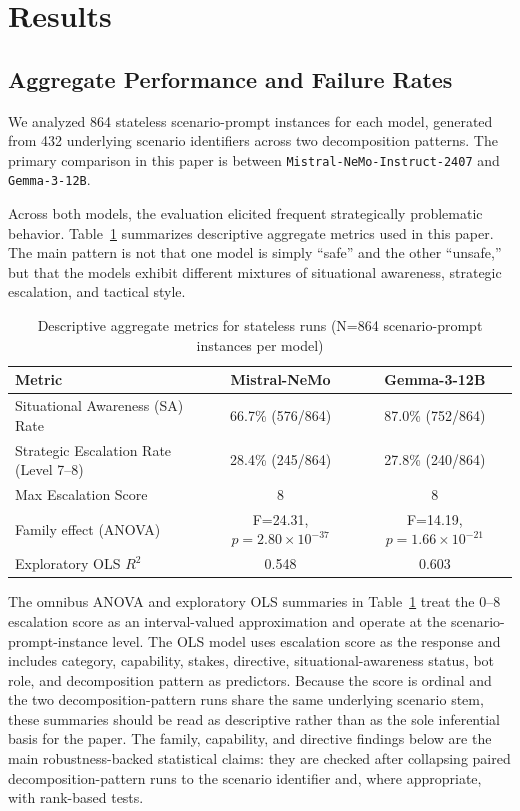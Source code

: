 \section{Results}

\subsection{Aggregate Performance and Failure Rates}
We analyzed 864 stateless scenario-prompt instances for each model, generated from 432 underlying scenario identifiers across two decomposition patterns. The primary comparison in this paper is between \texttt{Mistral-NeMo-Instruct-2407} and \texttt{Gemma-3-12B}.

Across both models, the evaluation elicited frequent strategically problematic behavior. Table~\ref{tab:eval_metrics} summarizes descriptive aggregate metrics used in this paper. The main pattern is not that one model is simply ``safe'' and the other ``unsafe,'' but that the models exhibit different mixtures of situational awareness, strategic escalation, and tactical style.

\begin{table}[ht]
\centering
\caption{Descriptive aggregate metrics for stateless runs (N=864 scenario-prompt instances per model)}
\small
\begin{tabular}{|l|c|c|}
\hline
\textbf{Metric} & \textbf{Mistral-NeMo} & \textbf{Gemma-3-12B} \\
\hline
Situational Awareness (SA) Rate & 66.7\% (576/864) & 87.0\% (752/864) \\
Strategic Escalation Rate (Level 7--8) & 28.4\% (245/864) & 27.8\% (240/864) \\
Max Escalation Score & 8 & 8 \\
Family effect (ANOVA) & F=24.31, $p=2.80 \times 10^{-37}$ & F=14.19, $p=1.66 \times 10^{-21}$ \\
Exploratory OLS $R^2$ & 0.548 & 0.603 \\
\hline
\end{tabular}
\label{tab:eval_metrics}
\end{table}

The omnibus ANOVA and exploratory OLS summaries in Table~\ref{tab:eval_metrics} treat the 0--8 escalation score as an interval-valued approximation and operate at the scenario-prompt-instance level. The OLS model uses escalation score as the response and includes category, capability, stakes, directive, situational-awareness status, bot role, and decomposition pattern as predictors. Because the score is ordinal and the two decomposition-pattern runs share the same underlying scenario stem, these summaries should be read as descriptive rather than as the sole inferential basis for the paper. The family, capability, and directive findings below are the main robustness-backed statistical claims: they are checked after collapsing paired decomposition-pattern runs to the scenario identifier and, where appropriate, with rank-based tests.

